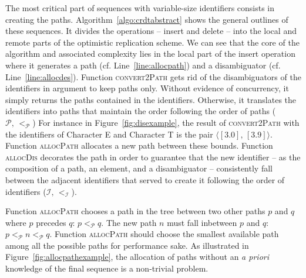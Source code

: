 The most critical part of sequences with variable-size identifiers consists in
creating the paths. Algorithm~\ref{algo:crdtabstract} shows the general outlines
of these sequences. It divides the operations -- insert and delete -- into the
local and remote parts of the optimistic replication scheme. We can see that the
core of the algorithm and associated complexity lies in the local part of the
insert operation where it generates a path (cf. Line~\ref{line:allocpath}) and a
disambiguator (cf. Line~\ref{line:allocdes}). Function \textsc{convert2Path}
gets rid of the disambiguators of the identifiers in argument to keep paths
only. Without evidence of concurrency, it simply returns the paths contained in
the identifiers. Otherwise, it translates the identifiers into paths that
maintain the order following the order of paths
($\mathcal{P},\, <_{\mathcal{P}}$) For instance in Figure~\ref{fig:disexample},
the result of \textsc{convert2Path} with the identifiers of Character E and
Character T is the pair $\langle [3.0],\, [3.9]\rangle$. Function
\textsc{allocPath} allocates a new path between these bounds. Function
\textsc{allocDis} decorates the path in order to guarantee that the new
identifier -- as the composition of a path, an element, and a disambiguator --
consistently fall between the adjacent identifiers that served to create it
following the order of identifiers ($\mathcal{I}, \, <_\mathcal{I}$).

\begin{algorithm}[h]
  
  \caption{\label{algo:crdtabstract}General outlines of a sequence with
    variable-size identifiers.}
\end{algorithm}

Function \textsc{allocPath} chooses a path in the tree between two other paths
$p$ and $q$ where $p$ precedes $q$: $p<_{\mathcal{P}}q$. The new path $n$ must
fall inbetween $p$ and $q$: $p<_\mathcal{P}n<_\mathcal{P}q$. 
Function \textsc{allocPath} should choose the smallest available path among all
the possible paths for performance sake.
As illustrated in Figure~\ref{fig:allocpathexample}, the allocation of paths
without an \emph{a priori} knowledge of the final sequence is a non-trivial
problem.

\begin{figure*}
  \centering
  \hspace{50pt}
  \caption{\label{fig:allocpathexample} Two trees filled with the resulting
    identifiers of two different permutations resulting in an identical sequence
    QWERTY. Function \textsc{allocPath} allocates the leftmost branch in the
    tree. All paths of the nearly optimal case have a length of 1 while the tree
    of the worst case grows up to a depth of 6.}
\end{figure*}

